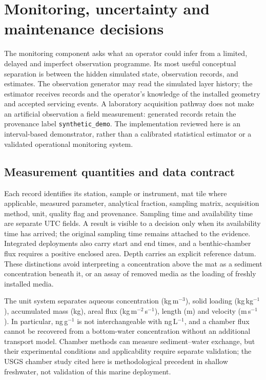 \section{Monitoring, uncertainty and maintenance decisions}
\label{sec:monitoring}

The monitoring component asks what an operator could infer from a limited, delayed and imperfect observation programme. Its most useful conceptual separation is between the hidden simulated state, observation records, and estimates. The observation generator may read the simulated layer history; the estimator receives records and the operator's knowledge of the installed geometry and accepted servicing events. A laboratory acquisition pathway does not make an artificial observation a field measurement: generated records retain the provenance label \texttt{synthetic\_demo}. The implementation reviewed here is an interval-based demonstrator, rather than a calibrated statistical estimator or a validated operational monitoring system.

\subsection{Measurement quantities and data contract}

Each record identifies its station, sample or instrument, mat tile where applicable, measured parameter, analytical fraction, sampling matrix, acquisition method, unit, quality flag and provenance. Sampling time and availability time are separate UTC fields. A result is visible to a decision only when its availability time has arrived; the original sampling time remains attached to the evidence. Integrated deployments also carry start and end times, and a benthic-chamber flux requires a positive enclosed area. Depth carries an explicit reference datum. These distinctions avoid interpreting a concentration above the mat as a sediment concentration beneath it, or an assay of removed media as the loading of freshly installed media.

The unit system separates aqueous concentration (kg\,m$^{-3}$), solid loading (kg\,kg$^{-1}$), accumulated mass (kg), areal flux (kg\,m$^{-2}$\,s$^{-1}$), length (m) and velocity (m\,s$^{-1}$). In particular, ng\,g$^{-1}$ is not interchangeable with ng\,L$^{-1}$, and a chamber flux cannot be recovered from a bottom-water concentration without an additional transport model. Chamber methods can measure sediment--water exchange, but their experimental conditions and applicability require separate validation; the USGS chamber study cited here is methodological precedent in shallow freshwater, not validation of this marine deployment.\cite{benthicFluxMonitoring}

